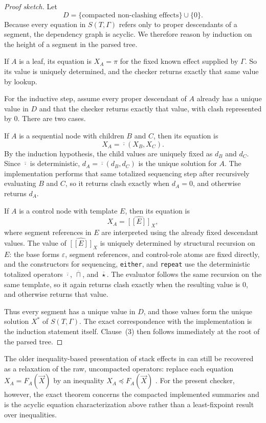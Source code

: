 \documentclass[acmsmall,screen,review,anonymous,nonacm]{acmart}
\newcommand{\glb}{\mathbin{\sqcap}}
\newcommand{\compose}{\mathbin{\cdot}}
\newcommand{\eps}{\varepsilon}
\newcommand{\sem}[1]{[\![#1]\!]}
\begin{document}
\begin{proof}[Proof sketch]
Let
\[
D = \{\text{compacted non-clashing effects}\} \cup \{0\}.
\]
Because every equation in $S(T,\Gamma)$ refers only to proper descendants of a segment,
the dependency graph is acyclic. We therefore reason by induction on the height of a
segment in the parsed tree.

If $A$ is a leaf, its equation is $X_A=\pi$ for the fixed known effect supplied by
$\Gamma$. So its value is uniquely determined, and the checker returns exactly that same
value by lookup.

For the inductive step, assume every proper descendant of $A$ already has a unique value
in $D$ and that the checker returns exactly that value, with clash represented by $0$.
There are two cases.

If $A$ is a sequential node with children $B$ and $C$, then its equation is
\[
X_A=\overline{\compose}(X_B,X_C).
\]
By the induction hypothesis, the child values are uniquely fixed as $d_B$ and $d_C$.
Since $\overline{\compose}$ is deterministic, $d_A=\overline{\compose}(d_B,d_C)$ is the
unique solution for $A$. The implementation performs that same totalized sequencing step
after recursively evaluating $B$ and $C$, so it returns clash exactly when $d_A=0$, and
otherwise returns $d_A$.

If $A$ is a control node with template $E$, then its equation is
\[
X_A=\widehat{\sem{E}}_X,
\]
where segment references in $E$ are interpreted using the already fixed descendant values.
The value of $\widehat{\sem{E}}_X$ is uniquely determined by structural recursion on $E$:
the base forms $\eps$, segment references, and control-role atoms are fixed directly, and
the constructors for sequencing, \texttt{either}, and \texttt{repeat} use the
deterministic totalized operators $\overline{\compose}$, $\overline{\glb}$, and
$\overline{\star}$. The evaluator follows the same recursion on the same template, so it
again returns clash exactly when the resulting value is $0$, and otherwise returns that
value.

Thus every segment has a unique value in $D$, and those values form the unique solution
$X^\ast$ of $S(T,\Gamma)$. The exact correspondence with the implementation is the
induction statement itself. Clause~(3) then follows immediately at the root of the parsed
tree.
\end{proof}

The older inequality-based presentation of stack effects in
\cite{poial1991algebraic,poial1992multiple} can still be recovered as a
relaxation of the raw, uncompacted operators:
replace each equation $X_A = F_A(\vec{X})$ by an inequality
$X_A \preceq F_A(\vec{X})$ \cite{poial1991algebraic,poial1992multiple}. For the
present checker, however, the exact theorem concerns the compacted implemented
summaries and is the acyclic equation characterization above rather than a
least-fixpoint result over inequalities.
\end{document}
